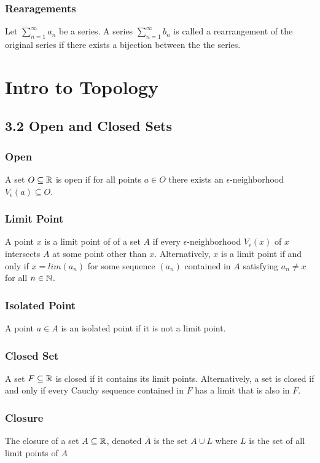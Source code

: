 \documentclass{article}
\begin{document}
\subsubsection*{Rearagements}
Let $\sum_{n=1}^{\infty} a_n$ be a series. A series $\sum_{n=1}^{\infty} b_n$ is called a rearrangement of the original series if there exists a bijection between the the series.

\section{Intro to Topology}
\subsection*{3.2 Open and Closed Sets}
\subsubsection*{Open}
A set $O \subseteq \protect\mathbb{R}$ is open if for all points $a \in O$ there exists an $\epsilon$-neighborhood $V_{\epsilon}(a) \subseteq O$.

\subsubsection*{Limit Point}
A point $x$ is a limit point of of a set $A$ if every $\epsilon$-neighborhood $V_\epsilon (x)$ of $x$ intersects $A$ at some point other than $x$.
Alternatively, $x$ is a limit point if and only if $x=lim(a_n)$ for some sequence $(a_n)$ contained in $A$ satisfying $a_n \ne x$ for all $n \in \protect\mathbb{N}$.

\subsubsection*{Isolated Point}
A point $a \in A$ is an isolated point if it is not a limit point.

\subsubsection*{Closed Set}
A set $F \subseteq \protect\mathbb{R}$ is closed if it contains its limit points. Alternatively, a set is closed if and only if every Cauchy sequence contained in $F$ has a limit that is also in $F$.

\subsubsection*{Closure}
The closure of a set $A \subseteq \protect\mathbb{R}$, denoted $\overline{A}$ is the set $A \cup L$ where $L$ is the set of all limit points of $A$
\end{document}
